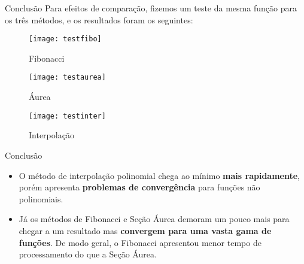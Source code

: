 \begin{frame}[t]{Conclusão}
	Para efeitos de comparação, fizemos um teste da mesma função para os três métodos, e os resultados foram os seguintes:
	
\begin{figure}
	\centering
	\begin{minipage}{0.32\textwidth}
		\centering
		\texttt{[image: testfibo]}
		\caption{Fibonacci}
		\label{fig:test_fibo}
	\end{minipage}\hfill
	\begin{minipage}{0.32\textwidth}
		\centering
		\texttt{[image: testaurea]}
		\caption{Áurea}
		\label{fig:test_aurea}
	\end{minipage}
	\begin{minipage}{0.32\textwidth}
		\centering
		\texttt{[image: testinter]}
		\caption{Interpolação}
		\label{fig:test_inter}
	\end{minipage}	
\end{figure}
	
\end{frame}

\begin{frame}[t]{Conclusão}
\begin{itemize}


	\item O método de interpolação polinomial chega ao mínimo \textbf{mais rapidamente}, porém apresenta \textbf{problemas de convergência} para funções não polinomiais.\\
	\vspace{2mm}
	\item Já os métodos de Fibonacci e Seção Áurea demoram um pouco mais para chegar a um resultado mas \textbf{convergem para uma vasta gama de funções}. De modo geral, o Fibonacci apresentou menor tempo de processamento do que a Seção Áurea.
	\end{itemize}
	
\end{frame}
